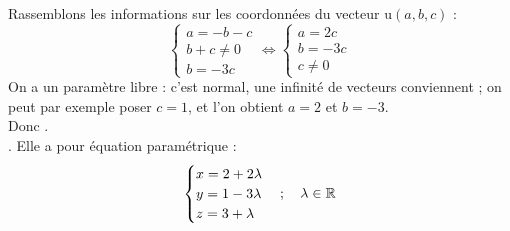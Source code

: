 \documentclass[a4paper, 11pt]{article}
\begin{document}
\begin{correction}
	Rassemblons les informations sur les coordonn\'ees du vecteur $\text{u}(a,b,c)$ :
	$$ \begin{cases} a = -b-c \\ b+c \neq 0 \\ b=-3c \end{cases} \iff \begin{cases} a=2c \\ b=-3c \\ c \neq 0\end{cases}$$
	On a un param\`etre libre : c'est normal, une infinit\'e de vecteurs conviennent ; on peut par exemple poser $c=1$, et l'on obtient $a=2$ et $b=-3$.\\
	Donc .\\
	. Elle a pour \'equation param\'etrique :
	$$ \begin{cases} x=2+2 \lambda\\ y=1-3 \lambda\\ z=3+ \lambda \end{cases} ; \quad \lambda\in \mathbb{R} $$
\end{correction}
\end{document}

